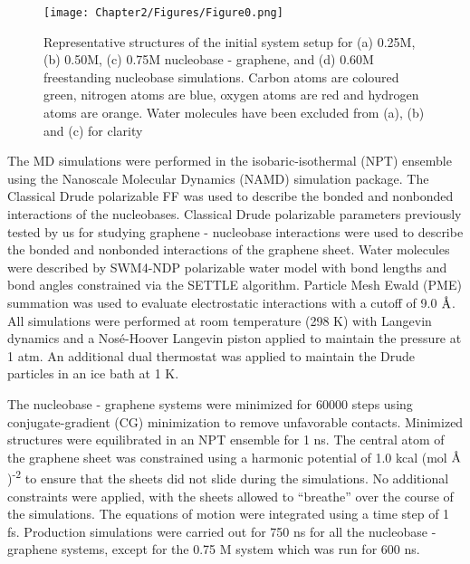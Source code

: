 \begin{figure}
    \centering
    \texttt{[image: Chapter2/Figures/Figure0.png]}
    \caption[Representative structures of the initial system setup for various systems investigated in this paper]{Representative structures of the initial system setup for (a) 0.25M, (b) 0.50M, (c) 0.75M nucleobase - graphene, and (d) 0.60M freestanding nucleobase simulations. Carbon atoms are coloured green, nitrogen atoms are blue, oxygen atoms are red and hydrogen atoms are orange. Water molecules have been excluded from (a), (b) and (c) for clarity}
\end{figure}

The MD simulations were performed in the isobaric-isothermal (NPT) ensemble using the Nanoscale Molecular Dynamics (NAMD) simulation package.\supercite{phillips_scalable_2005} The Classical Drude polarizable FF was used to describe the bonded and nonbonded interactions of the nucleobases. Classical Drude polarizable parameters previously tested by us for studying graphene - nucleobase interactions\supercite{h_polarization_2021} were used to describe the bonded and nonbonded interactions of the graphene sheet. Water molecules were described by SWM4-NDP polarizable water model\supercite{lamoureux_polarizable_2006} with bond lengths and bond angles constrained via the SETTLE\supercite{miyamoto_settle_1992} algorithm. Particle Mesh Ewald (PME) summation\supercite{darden_particle_1993} was used to evaluate electrostatic interactions with a cutoff of 9.0 $\text{\normalfont\AA}$. All simulations were performed at room temperature (298 K) with Langevin dynamics and a Nos\'{e}-Hoover Langevin piston applied to maintain the pressure at 1 atm. An additional dual thermostat was applied to maintain the Drude particles in an ice bath at 1 K.

The nucleobase - graphene systems were minimized for 60000 steps using conjugate-gradient (CG) minimization to remove unfavorable contacts. Minimized structures were equilibrated in an NPT ensemble for 1 ns. The central atom of the graphene sheet was constrained using a harmonic potential of 1.0 kcal (mol $\text{\normalfont\AA}$)\textsuperscript{-2} to ensure that the sheets did not slide during the simulations. No additional constraints were applied, with the sheets allowed to ``breathe'' over the course of the simulations. The equations of motion were integrated using a time step of 1 fs. Production simulations were carried out for 750 ns for all the nucleobase - graphene systems, except for the 0.75 M system which was run for 600 ns. 

